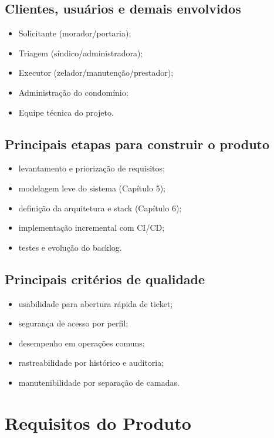 \documentclass[12pt,a4paper]{article}
\begin{document}
\subsection{Clientes, usuários e demais envolvidos}

\begin{itemize}
    \item Solicitante (morador/portaria);
    \item Triagem (síndico/administradora);
    \item Executor (zelador/manutenção/prestador);
    \item Administração do condomínio;
    \item Equipe técnica do projeto.
\end{itemize}

\subsection{Principais etapas para construir o produto}

\begin{itemize}
    \item levantamento e priorização de requisitos;
    \item modelagem leve do sistema (Capítulo 5);
    \item definição da arquitetura e stack (Capítulo 6);
    \item implementação incremental com CI/CD;
    \item testes e evolução do backlog.
\end{itemize}

\subsection{Principais critérios de qualidade}

\begin{itemize}
    \item usabilidade para abertura rápida de ticket;
    \item segurança de acesso por perfil;
    \item desempenho em operações comuns;
    \item rastreabilidade por histórico e auditoria;
    \item manutenibilidade por separação de camadas.
\end{itemize}

\section{Requisitos do Produto}
\end{document}

